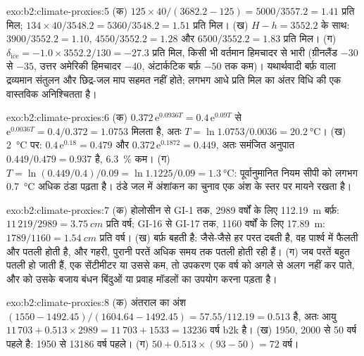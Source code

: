\begin{solution}{exo:b2:climate-proxies:5}
(क) $125 \times 40/(3682.2 - 125) = 5000/3557.2 = 1.41$ प्रति मिल; $134 \times 40/3548.2 =
5360/3548.2 = 1.51$ प्रति मिल। (ख) $H - h = 3552.2$ के साथ: $3900/3552.2 = 1.10$, $4550/3552.2 = 1.28$
और $6500/3552.2 = 1.83$ प्रति मिल। (ग) $\delta_{\mathrm{ice}} = -1.0 \times 3552.2/130 = -27.3$ प्रति
मिल, किसी भी वर्तमान हिमचादर से भारी (ग्रीनलैंड $-30$ से $-35$, उत्तर अमेरिकी हिमचादर
$-40$, अंटार्कटिक बर्फ़ $-50$ तक कम)। यथार्थवादी बर्फ़ वाला द्रव्यमान संतुलन और छिद्र-जल
माप सहमत नहीं होते; लगभग आधे प्रति मिल का अंतर विधि की एक वास्तविक अनिश्चितता है।
\end{solution}

\begin{solution}{exo:b2:climate-proxies:6}
(क) $0.372\,\mathrm{e}^{0.0936T} = 0.4\,\mathrm{e}^{0.09T}$ से $\mathrm{e}^{0.0036T} =
0.4/0.372 = 1.0753$ मिलता है, अतः $T = \ln 1.0753/0.0036 = \qty{20.2}{\celsius}$। (ख)
\qty{2}{\celsius} पर: $0.4\,\mathrm{e}^{0.18} = 0.479$ और $0.372\,\mathrm{e}^{0.1872} = 0.449$, अतः
समंजित अनुपात $0.449/0.479 = 0.937$ है, \qty{6.3}{\percent} कम। (ग) $T = \ln(0.449/0.4)/0.09 =
\ln 1.1225/0.09 = \qty{1.3}{\celsius}$: पूर्वानुमानित नियम सीपी को लगभग
\qty{0.7}{\celsius} अधिक ठंडा पढ़ता है। ठंडे जल में अंशांकन का चुनाव एक अंश के स्तर पर
मायने रखता है।
\end{solution}

\begin{solution}{exo:b2:climate-proxies:7}
(क) होलोसीन से GI-1 तक, 2989 वर्षों के लिए \qty{112.19}{m} बर्फ़: $11\,219/2989 =
\qty{3.75}{cm}$ प्रति वर्ष; GI-16 से GI-17 तक, 1160 वर्षों के लिए \qty{17.89}{m}: $1789/1160 =
\qty{1.54}{cm}$ प्रति वर्ष। (ख) बर्फ़
बहती है: जैसे-जैसे हर परत दबती है, वह पार्श्व में फैलती और पतली होती है, और गहरी, पुरानी परतें
अधिक समय तक पतली होती रही हैं। (ग) जब परतें बहुत पतली हो जाती हैं, एक सेंटीमीटर या उससे कम, तो उपकरण
एक वर्ष को अगले से अलग नहीं कर पाते, और  को उसके बजाय बंधन बिंदुओं या प्रवाह मॉडलों का
उपयोग करना पड़ता है।
\end{solution}

\begin{solution}{exo:b2:climate-proxies:8}
(क) अंतराल का अंश $(1550 - 1492.45)/(1604.64 - 1492.45) = 57.55/112.19 = 0.513$ है,
अतः आयु $11\,703 + 0.513 \times 2989 = 11\,703 + 1533 = \num{13236}$ वर्ष b2k है। (ख) 1950, 2000 से 50
वर्ष पहले है: 1950 से \num{13186} वर्ष पहले। (ग) $50 + 0.513 \times (93 - 50) = 72$ वर्ष।
\end{solution}

